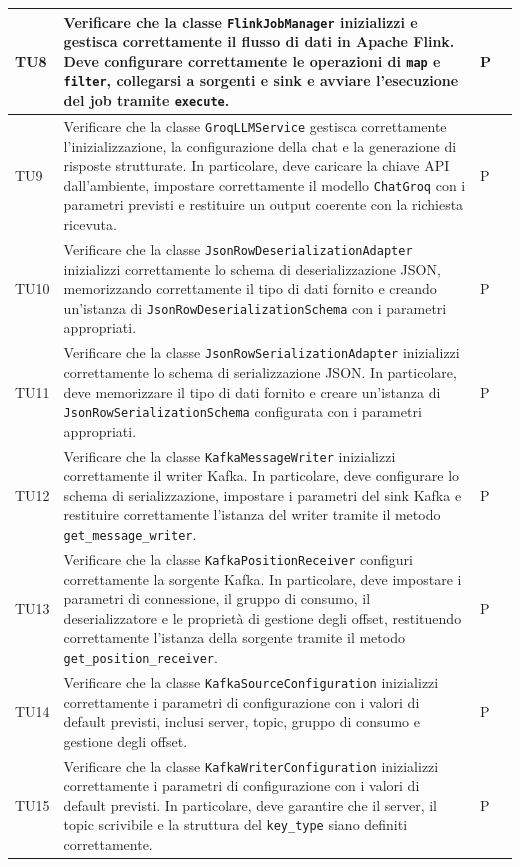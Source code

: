 \documentclass[10pt]{article}
\begin{document}
\begin{justify}
\begin{longtable}{|>{\centering\arraybackslash}m{2cm}|>{\centering\arraybackslash}m{7cm}|>{\centering\arraybackslash}m{2cm}|>{\centering\arraybackslash}m{2cm}|}
\hline
TU8 & Verificare che la classe \texttt{FlinkJobManager} inizializzi e gestisca correttamente il flusso di dati in Apache Flink. Deve configurare correttamente le operazioni di \texttt{map} e \texttt{filter}, collegarsi a sorgenti e sink e avviare l'esecuzione del job tramite \texttt{execute}. & P \\
\hline
TU9 & Verificare che la classe \texttt{GroqLLMService} gestisca correttamente l'inizializzazione, la configurazione della chat e la generazione di risposte strutturate. In particolare, deve caricare la chiave API dall'ambiente, impostare correttamente il modello \texttt{ChatGroq} con i parametri previsti e restituire un output coerente con la richiesta ricevuta. & P \\
\hline
TU10 & Verificare che la classe \texttt{JsonRowDeserializationAdapter} inizializzi correttamente lo schema di deserializzazione JSON, memorizzando correttamente il tipo di dati fornito e creando un'istanza di \texttt{JsonRowDeserializationSchema} con i parametri appropriati. & P \\
\hline
TU11 & Verificare che la classe \texttt{JsonRowSerializationAdapter} inizializzi correttamente lo schema di serializzazione JSON. In particolare, deve memorizzare il tipo di dati fornito e creare un'istanza di \texttt{JsonRowSerializationSchema} configurata con i parametri appropriati. & P \\
\hline
TU12 & Verificare che la classe \texttt{KafkaMessageWriter} inizializzi correttamente il writer Kafka. In particolare, deve configurare lo schema di serializzazione, impostare i parametri del sink Kafka e restituire correttamente l'istanza del writer tramite il metodo \texttt{get\_message\_writer}. & P \\
\hline
TU13 & Verificare che la classe \texttt{KafkaPositionReceiver} configuri correttamente la sorgente Kafka. In particolare, deve impostare i parametri di connessione, il gruppo di consumo, il deserializzatore e le proprietà di gestione degli offset, restituendo correttamente l'istanza della sorgente tramite il metodo \texttt{get\_position\_receiver}. & P \\
\hline
TU14 & Verificare che la classe \texttt{KafkaSourceConfiguration} inizializzi correttamente i parametri di configurazione con i valori di default previsti, inclusi server, topic, gruppo di consumo e gestione degli offset. & P \\
\hline
TU15 & Verificare che la classe \texttt{KafkaWriterConfiguration} inizializzi correttamente i parametri di configurazione con i valori di default previsti. In particolare, deve garantire che il server, il topic scrivibile e la struttura del \texttt{key\_type} siano definiti correttamente. & P \\

\end{longtable}
\end{justify}
\end{document}
